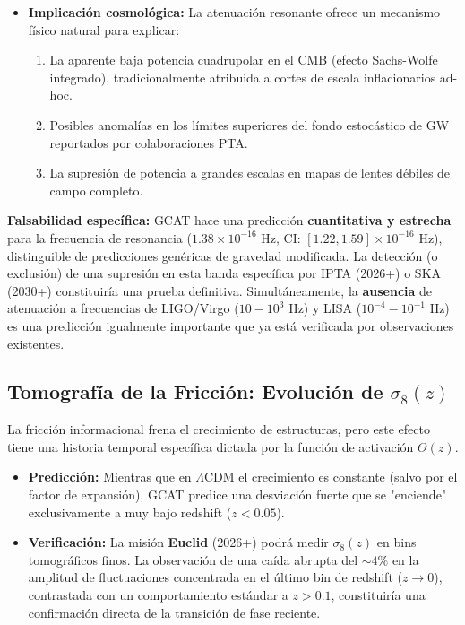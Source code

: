 \documentclass[12pt, a4paper]{article}
\theoremstyle{plain}
\theoremstyle{definition}
\begin{document}
\begin{itemize}
    \item \textbf{Implicación cosmológica:} La atenuación resonante ofrece un mecanismo físico natural para explicar:
    \begin{enumerate}
        \item La aparente baja potencia cuadrupolar en el CMB (efecto Sachs-Wolfe integrado), tradicionalmente atribuida a cortes de escala inflacionarios ad-hoc.
        \item Posibles anomalías en los límites superiores del fondo estocástico de GW reportados por colaboraciones PTA.
        \item La supresión de potencia a grandes escalas en mapas de lentes débiles de campo completo.
    \end{enumerate}
\end{itemize}

\textbf{Falsabilidad específica:} GCAT hace una predicción \textbf{cuantitativa y estrecha} para la frecuencia de resonancia ($1.38 \times 10^{-16}$ Hz, CI: $[1.22, 1.59] \times 10^{-16}$ Hz), distinguible de predicciones genéricas de gravedad modificada. La detección (o exclusión) de una supresión en esta banda específica por IPTA (2026+) o SKA (2030+) constituiría una prueba definitiva. Simultáneamente, la \textbf{ausencia} de atenuación a frecuencias de LIGO/Virgo ($10-10^3$ Hz) y LISA ($10^{-4}-10^{-1}$ Hz) es una predicción igualmente importante que ya está verificada por observaciones existentes.



\subsection{Tomografía de la Fricción: Evolución de \texorpdfstring{$\sigma_8(z)$}{sigma8(z)}}

La fricción informacional frena el crecimiento de estructuras, pero este efecto tiene una historia temporal específica dictada por la función de activación $\Theta(z)$.

\begin{itemize}
    \item \textbf{Predicción:} Mientras que en $\Lambda$CDM el crecimiento es constante (salvo por el factor de expansión), GCAT predice una desviación fuerte que se "enciende" exclusivamente a muy bajo redshift ($z < 0.05$).
    \item \textbf{Verificación:} La misión \textbf{Euclid} (2026+) podrá medir $\sigma_8(z)$ en bins tomográficos finos. La observación de una caída abrupta del $\sim 4\%$ en la amplitud de fluctuaciones concentrada en el último bin de redshift ($z \to 0$), contrastada con un comportamiento estándar a $z > 0.1$, constituiría una confirmación directa de la transición de fase reciente.
\end{itemize}
\end{document}
